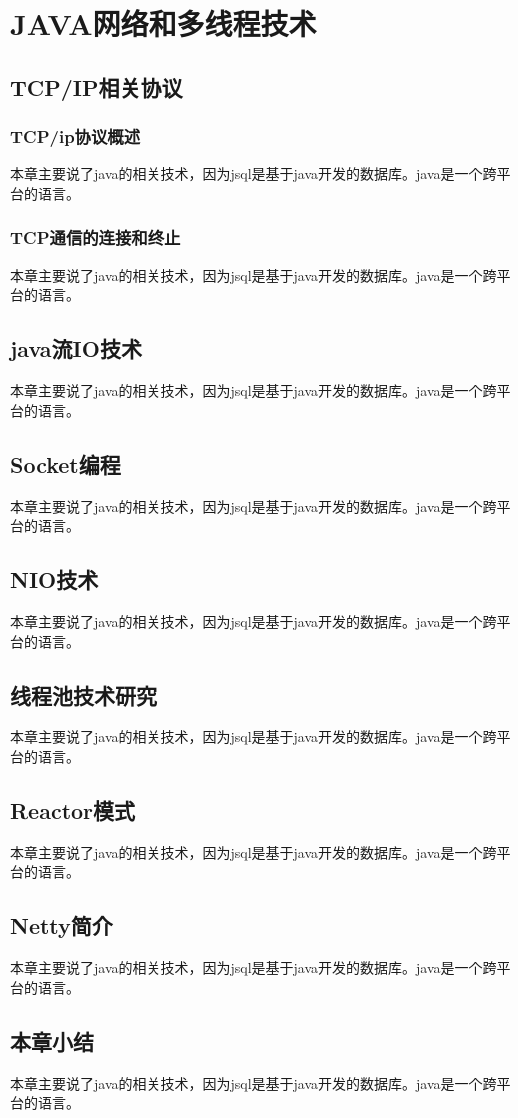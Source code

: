
\chapter{JAVA网络和多线程技术}
\section{TCP/IP相关协议}
\subsection{TCP/ip协议概述}
本章主要说了java的相关技术，因为jsql是基于java开发的数据库。java是一个跨平台的语言。
\subsection{TCP通信的连接和终止}
本章主要说了java的相关技术，因为jsql是基于java开发的数据库。java是一个跨平台的语言。
\section{java流IO技术}

本章主要说了java的相关技术，因为jsql是基于java开发的数据库。java是一个跨平台的语言。

\section{Socket编程}
本章主要说了java的相关技术，因为jsql是基于java开发的数据库。java是一个跨平台的语言。
\section{NIO技术}

本章主要说了java的相关技术，因为jsql是基于java开发的数据库。java是一个跨平台的语言。

\section{线程池技术研究}
本章主要说了java的相关技术，因为jsql是基于java开发的数据库。java是一个跨平台的语言。
\section{Reactor模式}
本章主要说了java的相关技术，因为jsql是基于java开发的数据库。java是一个跨平台的语言。


\section{Netty简介}
本章主要说了java的相关技术，因为jsql是基于java开发的数据库。java是一个跨平台的语言。

\section{本章小结}
本章主要说了java的相关技术，因为jsql是基于java开发的数据库。java是一个跨平台的语言。

